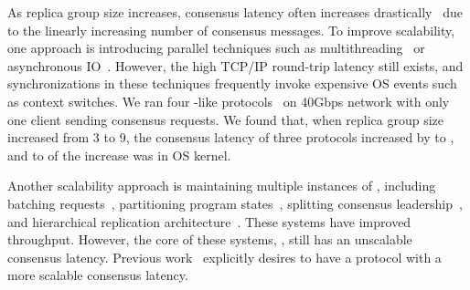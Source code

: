 
As replica group size increases, \paxos consensus latency often increases
drastically~\cite{scatter:sosp11} due to the linearly increasing number of 
consensus messages. To improve scalability,
one approach is introducing parallel techniques such as 
multithreading~\cite{zookeeper, spaxos:srds12} or asynchronous 
IO~\cite{crane:sosp15, libpaxos}. However, the high TCP/IP round-trip latency 
still exists, and synchronizations in these techniques
frequently invoke expensive OS events such as context switches. We ran four
\paxos-like protocols~\cite{zookeeper, crane:sosp15, spaxos:srds12, libpaxos} on 
40Gbps network with only one client sending consensus requests. We found 
that, when replica group size increased from 3 to 9, the consensus latency of 
three protocols increased by \tradlatencyincreaselow to 
\tradlatencyincreasehigh, and \systemcostlow to \systemcosthigh of the increase 
was in OS kernel.

Another scalability approach is maintaining multiple instances of \paxos, 
including batching requests~\cite{calvin:sigmod12}, partitioning program 
states~\cite{scatter:sosp11,ssmr:dsn14}, splitting consensus 
leadership~\cite{mencius:osdi08,spaxos:srds12}, and hierarchical 
replication architecture~\cite{manos:hotdep10,scatter:sosp11}. These systems 
have improved throughput. However, the core of these systems, \paxos, 
still has an unscalable consensus latency. Previous
work~\cite{ellis:thesis,scatter:sosp11,manos:hotdep10} explicitly desires to 
have a \paxos protocol with a more scalable consensus latency.





